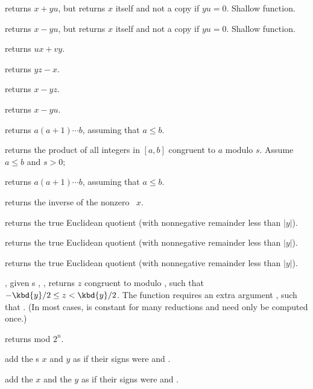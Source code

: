  returns $x +yu$, but
returns $x$ itself and not a copy if $yu = 0$. Shallow function.

 returns $x- yu$, but
returns $x$ itself and not a copy if $yu = 0$. Shallow function.

 returns $ux + vy$.

 returns $yz - x$.

 returns $x - yz$.

 returns $x -yu$.

 returns $a(a+1)\cdots b$, assuming
that $a \leq b$.

 returns the product
of all integers in $[a,b]$ congruent to $a$ modulo $s$. Assume $a\leq b$ and
$s > 0$;

 returns $a(a+1)\cdots b$, assuming
that $a \leq b$.

 returns the inverse of the nonzero ~$x$.

 returns the true Euclidean quotient
(with nonnegative remainder less than $|y|$).

 returns the true Euclidean quotient
(with nonnegative remainder less than $|y|$).

 returns the true Euclidean quotient
(with nonnegative remainder less than $|y|$).

, given
s , , returns $z$ congruent to  modulo ,
such that $-\kbd{y}/2 \leq z < \kbd{y}/2$. The function requires an extra
argument , such that . (In most cases, 
is constant for many reductions and  need only be computed once.)

 returns  mod $2^n$.

 add the s
$x$ and $y$ as if their signs were  and .

add the  $x$ and the  $y$ as if their signs were 
and .

